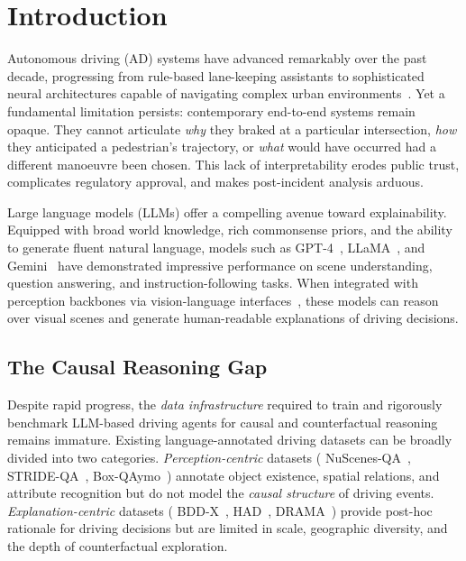 \section{Introduction}
\label{sec:introduction}

Autonomous driving (AD) systems have advanced remarkably over the past decade, progressing
from rule-based lane-keeping assistants to sophisticated neural architectures capable of
navigating complex urban environments~\cite{caesar2020nuscenes,sun2020scalability,
geiger2012we}. Yet a fundamental limitation persists: contemporary end-to-end systems
remain opaque. They cannot articulate \emph{why} they braked at a particular intersection,
\emph{how} they anticipated a pedestrian's trajectory, or \emph{what} would have occurred had
a different manoeuvre been chosen. This lack of interpretability erodes public trust,
complicates regulatory approval, and makes post-incident analysis arduous.

Large language models (LLMs) offer a compelling avenue toward explainability. Equipped with
broad world knowledge, rich commonsense priors, and the ability to generate fluent natural
language, models such as GPT-4~\cite{openai2023gpt4}, LLaMA~\cite{touvron2023llama2}, and
Gemini~\cite{google2023gemini} have demonstrated impressive performance on scene understanding,
question answering, and instruction-following tasks. When integrated with perception backbones
via vision-language interfaces~\cite{radford2021learning,li2023blip2,liu2023visual},
these models can reason over visual scenes and generate human-readable explanations of
driving decisions.

\subsection*{The Causal Reasoning Gap}

Despite rapid progress, the \emph{data infrastructure} required to train and rigorously
benchmark LLM-based driving agents for causal and counterfactual reasoning remains immature.
Existing language-annotated driving datasets can be broadly divided into two categories.
\emph{Perception-centric} datasets (\eg{} NuScenes-QA~\cite{qian2024nuscenes_qa},
STRIDE-QA~\cite{wu2024stride}, Box-QAymo~\cite{boxqaymo2024}) annotate object existence,
spatial relations, and attribute recognition but do not model the \emph{causal structure}
of driving events.
\emph{Explanation-centric} datasets (\eg{} BDD-X~\cite{kim2018textual},
HAD~\cite{chen2019had}, DRAMA~\cite{malla2023drama}) provide post-hoc rationale for
driving decisions but are limited in scale, geographic diversity, and the depth of
counterfactual exploration.

